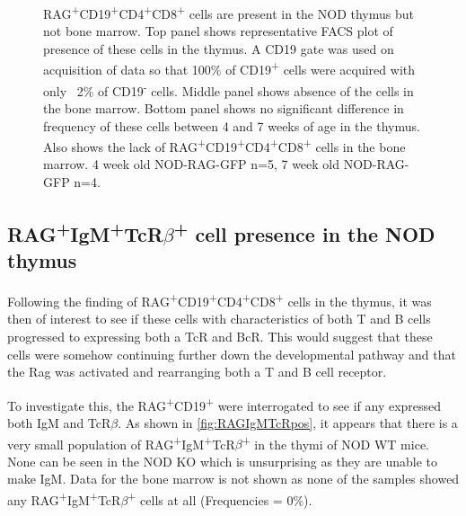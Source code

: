 \begin{figure}
\begin{subfigure}{\textwidth}
	\caption{}
	\label{BMvThyDPgraph}
	\end{subfigure}
\caption{RAG\textsuperscript{+}CD19\textsuperscript{+}CD4\textsuperscript{+}CD8\textsuperscript{+} cells are present in the NOD thymus but not bone marrow.
Top panel shows representative FACS plot of presence of these cells in the thymus. A CD19 gate was used on acquisition of data so that 100\% of CD19\textsuperscript{+} cells were acquired with only ~2\% of CD19\textsuperscript{-} cells.
Middle panel shows absence of the cells in the bone marrow.
Bottom panel shows no significant difference in frequency of these cells between 4 and 7 weeks of age in the thymus.
Also shows the lack of RAG\textsuperscript{+}CD19\textsuperscript{+}CD4\textsuperscript{+}CD8\textsuperscript{+} cells in the bone marrow.
4 week old NOD-RAG-GFP n=5, 7 week old NOD-RAG-GFP n=4.}
\label{fig:RAGCD19DP}
\end{figure}


\subsection{RAG\textsuperscript{+}IgM\textsuperscript{+}TcR$\beta$\textsuperscript{+} cell presence in the NOD thymus}


Following the finding of RAG\textsuperscript{+}CD19\textsuperscript{+}CD4\textsuperscript{+}CD8\textsuperscript{+} cells in the thymus, it was then of interest to see if these cells with characteristics of both T and B cells progressed to expressing both a TcR and BcR.
This would suggest that these cells were somehow continuing further down the developmental pathway and that the Rag was activated and rearranging both a T and B cell receptor.

To investigate this, the RAG\textsuperscript{+}CD19\textsuperscript{+} were interrogated to see if any expressed both IgM and TcR$\beta$.
As shown in \cref{fig:RAGIgMTcRpos}, it appears that there is a very small population of RAG\textsuperscript{+}IgM\textsuperscript{+}TcR$\beta$\textsuperscript{+} in the thymi of NOD WT mice.
None can be seen in the NOD KO which is unsurprising as they are unable to make IgM.
Data for the bone marrow is not shown as none of the samples showed any RAG\textsuperscript{+}IgM\textsuperscript{+}TcR$\beta$\textsuperscript{+} cells at all (Frequencies = 0\%).

